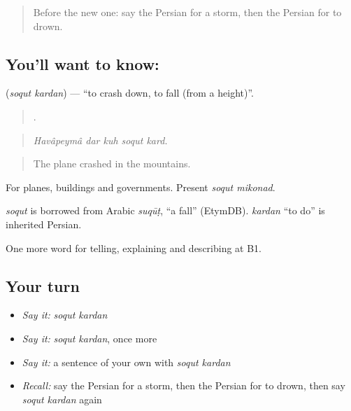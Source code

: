 \label{lesson:FA-C330-soqut-kardan}



\begin{quote}
Before the new one: say the Persian for a storm, then the Persian for to drown.
\end{quote}

\subsection*{You'll want to know:  }
\textbf{ } (\emph{soqut kardan}) — \textquotedblleft{}to crash down, to fall (from a height)\textquotedblright{}.

\begin{quote}
    .
\end{quote}

\begin{quote}
\emph{Havâpeymâ dar kuh soqut kard.}
\end{quote}

\begin{quote}
The plane crashed in the mountains.
\end{quote}

For planes, buildings and governments. Present \emph{soqut mikonad}.

\begin{cousinweb}
\emph{soqut} is borrowed from Arabic \emph{suqūṭ}, \textquotedblleft{}a fall\textquotedblright{} (EtymDB). \emph{kardan} \textquotedblleft{}to do\textquotedblright{} is inherited Persian.
\end{cousinweb}

\begin{grammarlens}[title={What you've built}]
One more word for telling, explaining and describing at B1.
\end{grammarlens}

\subsection*{Your turn}
\begin{itemize}
\raggedright
  \item \emph{Say it:} \emph{soqut kardan}
  \item \emph{Say it:} \emph{soqut kardan}, once more
  \item \emph{Say it:} a sentence of your own with \emph{soqut kardan}
  \item \emph{Recall:} say the Persian for a storm, then the Persian for to drown, then say \emph{soqut kardan} again
\end{itemize}


